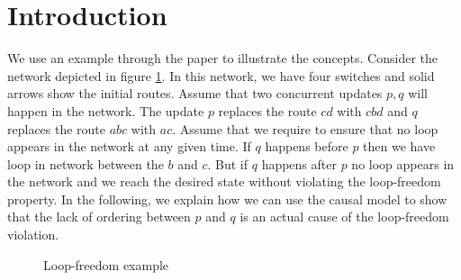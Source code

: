 \section{Introduction}

\begin{example}
\label{example:loop}
We use an example through the paper to illustrate 
the concepts.
Consider the network depicted in figure \ref{fig:loop}.
In this network, we have four switches and solid arrows show 
the initial routes.
Assume that two concurrent updates $p,q$ will happen in the network.
The update $p$ replaces the route $cd$ with $cbd$ and 
$q$ replaces the route $abc$ with $ac$.
Assume that we require to ensure that no loop appears in the network at 
any given time.
If $q$ happens before $p$ then we have loop in network between the $b$ 
and $c$.
But if $q$ happens after $p$ no loop appears in the network and we reach
the desired state without violating the loop-freedom property.
In the following, we explain how we can use the causal model to show that the 
lack of ordering between $p$ and $q$ is an actual cause of 
the loop-freedom violation.
\end{example}

\begin{figure}
    \centering
    \caption{Loop-freedom example}
    \label{fig:loop}
\end{figure}